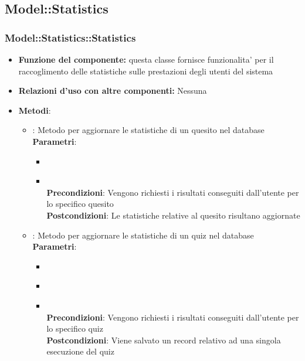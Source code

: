 \subsection{Model::Statistics}
\subsubsection{Model::Statistics::Statistics}
\begin{itemize}
\item\textbf{Funzione del componente:} questa classe fornisce funzionalita' per il raccoglimento delle statistiche sulle prestazioni degli utenti del sistema
\item\textbf{Relazioni d'uso con altre componenti:} Nessuna\\
\item\textbf{Metodi}:
\begin{itemize}
	\item{} : Metodo per aggiornare le statistiche di un quesito nel database\\
	\textbf{Parametri}:
	\begin{itemize}
		\item{}\\
		\item{}\\
		\textbf{Precondizioni}: Vengono richiesti i risultati conseguiti dall'utente per lo specifico quesito\\
		\textbf{Postcondizioni}: Le statistiche relative al quesito risultano aggiornate\\
	\end{itemize}
	\item{} : Metodo per aggiornare le statistiche di un quiz nel database\\
	\textbf{Parametri}:
	\begin{itemize}
		\item{}\\
		\item{}\\
		\item{}\\
		\textbf{Precondizioni}: Vengono richiesti i risultati conseguiti dall'utente per lo specifico quiz\\
		\textbf{Postcondizioni}: Viene salvato un record relativo ad una singola esecuzione del quiz\\

\end{itemize}
\end{itemize}
\end{itemize}

